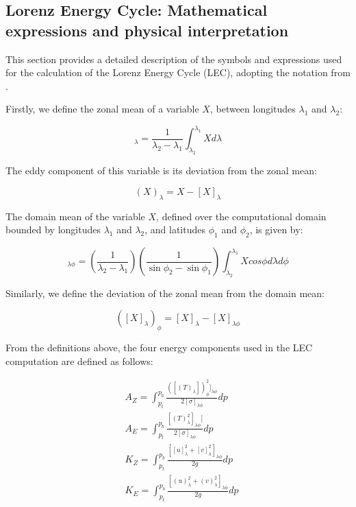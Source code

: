 \subsection{Lorenz Energy Cycle: Mathematical expressions and physical interpretation}\label{math}

This section provides a detailed description of the symbols and expressions used for the calculation of the Lorenz Energy Cycle (LEC), adopting the notation from \citet{michaelides1987limited}. 

Firstly, we define the zonal mean of a variable $X$, between longitudes $\lambda_{1}$ and $\lambda_{2}$:

 \begin{equation}
     [X]_\lambda = \frac{1}{\lambda_2 - \lambda_1} \int_{\lambda_2}^{\lambda_1} X d\lambda
 \end{equation}

The eddy component of this variable is its deviation from the zonal mean:

\begin{equation}
    (X)_\lambda =  X - [X]_\lambda
\end{equation}

The domain mean of the variable $X$, defined over the computational domain bounded by longitudes $\lambda_1$ and $\lambda_2$, and latitudes $\phi_1$ and $\phi_2$, is given by:

\begin{equation}
    [X]_{\lambda\phi} = \left(\frac{1}{\lambda_2 - \lambda_1}\right)  \left(\frac{1}{\sin\phi_2 - \sin\phi_1}\right) \int_{\lambda_2}^{\lambda_1} X cos\phi d\lambda d\phi 
\end{equation}

Similarly, we define the deviation of the zonal mean from the domain mean:

\begin{equation}
    ([X]_\lambda)_\phi = [X]_\lambda - [X]_{\lambda\phi}
\end{equation}

From the definitions above, the four energy components used in the LEC computation are defined as follows:

\begin{align}
   &A_Z = \int_{p_t}^{p_b} \frac{([(T)_\lambda ])_\phi^{2}]_{\lambda \phi}}  {2[\sigma]_{\lambda \phi}} dp \\
   &A_E = \int_{p_t}^{p_b} \frac{[(T)_\lambda^{2}]_{\lambda \phi}]}  {2[\sigma]_{\lambda \phi}} dp \\
   &K_Z =  \int_{p_t}^{p_b} \frac{[[u]_\lambda^2 + [v]_\lambda^2]_{\lambda \phi}}{2g} dp \\
   &K_E =  \int_{p_t}^{p_b} \frac{[(u)_\lambda^2 + (v)_\lambda^2]_{\lambda \phi}}{2g} dp
\end{align}

